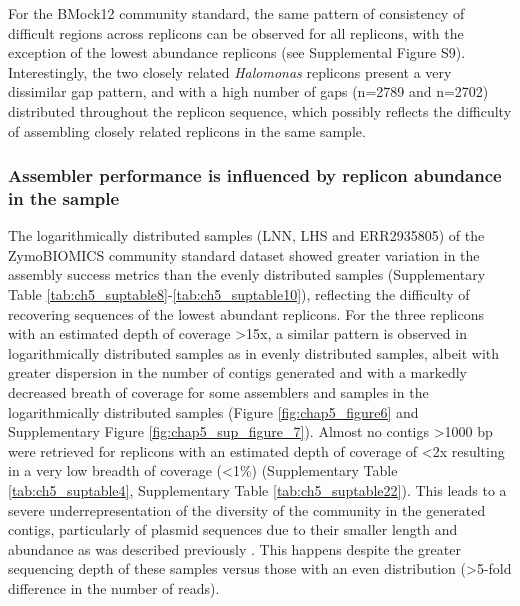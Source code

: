 For the BMock12 community standard, the same pattern of consistency of difficult regions across replicons can be observed for all replicons, with the exception of the lowest abundance replicons (see Supplemental Figure S9). Interestingly, the two closely related \textit{Halomonas} replicons present a very dissimilar gap pattern, and with a high number of gaps (n=2789 and n=2702) distributed throughout the replicon sequence, which possibly reflects the difficulty of assembling closely related replicons in the same sample.

\subsubsection{Assembler performance is influenced by replicon abundance in the sample}

The logarithmically distributed samples (LNN, LHS and ERR2935805) of the ZymoBIOMICS community standard dataset showed greater variation in the assembly success metrics than the evenly distributed samples (Supplementary Table \ref{tab:ch5_suptable8}-\ref{tab:ch5_suptable10}), reflecting the difficulty of recovering sequences of the lowest abundant replicons. For the three replicons with an estimated depth of coverage >15x, a similar pattern is observed in logarithmically distributed samples as in evenly distributed samples, albeit with greater dispersion in the number of contigs generated and with a markedly decreased breath of coverage for some assemblers and samples in the logarithmically distributed samples (Figure \ref{fig:chap5_figure6} and Supplementary Figure \ref{fig:chap5_sup_figure_7}). Almost no contigs >1000 \ac{bp} were retrieved for replicons with an estimated depth of coverage of <2x resulting in a very low breadth of coverage (<1\%) (Supplementary Table \ref{tab:ch5_suptable4}, Supplementary Table \ref{tab:ch5_suptable22}). This leads to a severe underrepresentation of the diversity of the community in the generated contigs, particularly of plasmid sequences due to their smaller length and abundance as was described previously \cite{sczyrba_critical_2017,meyer_critical_2022, fritz_camisim_2019}. This happens despite the greater sequencing depth of these samples versus those with an even distribution (>5-fold difference in the number of reads).

